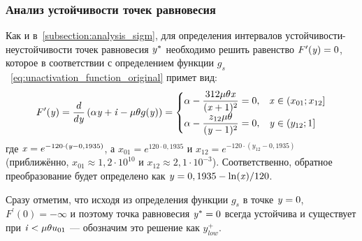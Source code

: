 \subsubsection{Анализ устойчивости точек равновесия}

Как и в~\autoref{subsection:analysis_sigm}, для определения интервалов устойчивости-неустойчивости точек равновесия $\mathit{y}^{*}$ необходимо решить равенство $F^{\prime}(\mathit{y}) = 0$, которое в соответствии с определением функции $g_{s}$~\eqref{eq:unactivation_function_original} примет вид:
\begin{equation}
\nonumber
    F^{\prime}(\mathit{y}) = \dfrac{d}{d\mathit{y}}\left( \alpha \mathit{y} + \mathit{i} - \mu \theta g(\mathit{y}) \right) = 
    \begin{cases}
        \alpha - \dfrac{312 \mu \theta \mathit{x}}{(\mathit{x} + 1)^{2}} = 0,   & \mathit{x} \in \left(x_{01}; x_{12}\right] \\
        \alpha - \dfrac{z_{12} \mu \theta}{(\mathit{y} - 1)^{2}} = 0,           & \mathit{y} \in \left(y_{12}; 1\right] \\
    \end{cases}
\end{equation}
где $\mathit{x} = e^{-120 \cdot (\mathit{y} - 0,1935)}$, а $x_{01} = e^{120 \cdot 0,1935}$ и $x_{12} = e^{-120 \cdot (y_{12} - 0,1935)}$ (приближённо, $x_{01} \approx 1,2 \cdot 10^{10}$ и $x_{12} \approx 2,1 \cdot 10^{-3}$). Соответственно, обратное преобразование будет определено как $\mathit{y} = 0,1935 - \ln(\mathit{x}) / 120$.

Сразу отметим, что исходя из определения функции $g_{s}$ в точке $\mathit{y} = 0$, $F^{\prime}(0) = -\infty$ и поэтому точка равновесия $\mathit{y}^{*} = 0$ всегда устойчива и существует при $\mathit{i} < \mu \theta u_{01}$ --- обозначим это решение как $y_{low}^{+}$.

